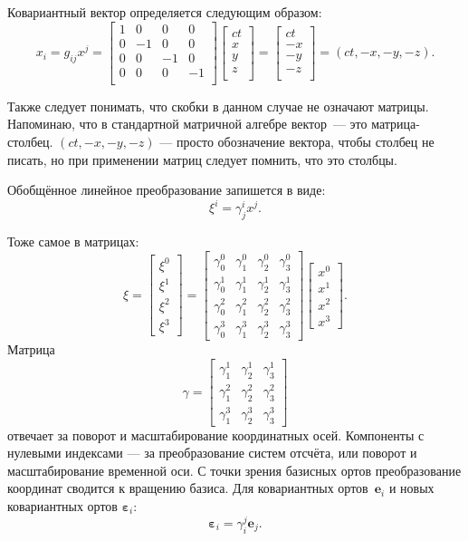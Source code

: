 \documentclass[a4paper,14pt]{extreport} %
\renewcommand{\vec}[1]{\bm{#1}}
\newcommand{\eps}{\varepsilon}
\begin{document}
	Ковариантный вектор определяется следующим образом:
	\[
		x_i = g_{ij} x^j = 
		\begin{bmatrix}
		1 & 0 & 0 & 0 \\
		0 & -1 & 0 & 0 \\
		0 & 0 & -1 & 0 \\
		0 & 0 & 0 & -1 \\
		\end{bmatrix}
		\begin{bmatrix}
		ct \\
		x \\
		y \\
		z \\
		\end{bmatrix} =\begin{bmatrix}
		ct \\
		-x \\
		-y \\
		-z \\
		\end{bmatrix} = (ct, -x, -y, -z).
	\]
	
	Также следует понимать, что скобки в данном случае не означают матрицы. Напоминаю, что в стандартной матричной алгебре вектор~--- это матрица-столбец. $(ct, -x, -y, -z)$ --- просто обозначение вектора, чтобы столбец не писать, но при применении матриц следует помнить, что это столбцы.
	
	Обобщённое линейное преобразование запишется в виде:
	\[
		\xi^i = \gamma_{j}^{i} x^j.
	\]
	
	Тоже самое в матрицах:
	\[
		\xi = 
		\begin{bmatrix}
			\xi^0 \\
			\xi^1 \\
			\xi^2 \\
			\xi^3 
		\end{bmatrix}
		=
		\begin{bmatrix}
			\gamma^0_0 & \gamma^0_1 & \gamma^0_2 & \gamma^0_3 \\
			\gamma^1_0 & \gamma^1_1 & \gamma^1_2 & \gamma^1_3 \\
			\gamma^2_0 & \gamma^2_1 & \gamma^2_2 & \gamma^2_3 \\
			\gamma^3_0 & \gamma^3_1 & \gamma^3_2 & \gamma^3_3 
		\end{bmatrix}
		\begin{bmatrix}
			x^0 \\
			x^1 \\
			x^2 \\
			x^3 
		\end{bmatrix}.
	\]
	Матрица 
	\[
		\gamma = 
		\begin{bmatrix}
		\gamma^1_1 & \gamma^1_2 & \gamma^1_3 \\
		\gamma^2_1 & \gamma^2_2 & \gamma^2_3 \\
		\gamma^3_1 & \gamma^3_2 & \gamma^3_3 
		\end{bmatrix}
	\]
	отвечает за поворот и масштабирование координатных осей. Компоненты с нулевыми индексами --- за преобразование систем отсчёта, или поворот и масштабирование временной оси. С точки зрения базисных ортов преобразование координат сводится к вращению базиса. Для ковариантных ортов~$\vec{e}_i$ и новых ковариантных ортов $\vec{\eps}_i$:
	\[
		\vec{\eps}_i = \gamma^j_i\vec{e}_j.
	\]
	
\end{document}
